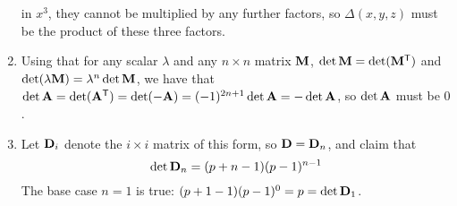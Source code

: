 \documentclass[fleqn,a4paper,11pt]{article}
\begin{document}
\begin{enumerate}[label=\textbf{\arabic*.}]
   in \(x^3\), they cannot be multiplied by any further factors, so
   \(\Delta(x, y, z)\) must be the product of these three factors.
  \item
   Using that for any scalar \(\lambda\) and any \(n \times n\) matrix
   \(\mathbf{M}\), \(\det\mathbf{M} = \det(\mathbf{M}^{\mathsf T})\) and
   \(\det(\lambda \mathbf{M}) = \lambda^n \det\mathbf{M}\), we have that
   \(\det\mathbf{A} = \det(\mathbf{A}^{\mathsf T})
     = \det(-\mathbf{A}) = (-1)^{2n + 1}\det\mathbf{A} = -\det\mathbf{A}\), so
   \(\det\mathbf{A}\) must be \(0\).
  \item
   Let \(\mathbf{D}_i\) denote the \(i \times i\) matrix of this form, so
   \(\mathbf{D} = \mathbf{D}_n\), and claim that
   \begin{equation*}
    \det  \mathbf{D}_n = (p + n - 1)(p - 1)^{n - 1}
   \end{equation*}
   The base case \(n = 1\) is true:
   \((p + 1 - 1)(p - 1)^0 = p = \det \mathbf{D}_1\).


\end{enumerate}
\end{document}
